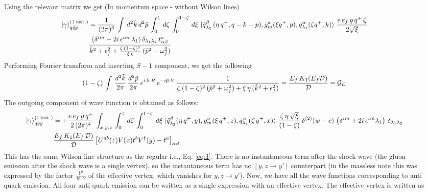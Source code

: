 \documentclass[9pt]{article}
\newif\ifmarked \markedtrue
\newcommand{\chg}[1]{\ifmarked{\color{red}#1}\else{#1}\fi}
\numberwithin{equation}{section}
\begin{document}
\begin{enumerate}
Using the relevant matrix  we get (In momentum space - without Wilson lines)
\begin{align}
\ket{\gamma}^{(1\,\text{inst.})}_{q\Bar{q}g} & = \frac{1}{(2\pi)^{6}}\, \int\, d^{2}\Tilde{k}\, d^{2}\Tilde{p}\, \int_{0}^{1}\, d\zeta\, \int_{0}^{1-\zeta}\, d\xi\,\ket{\Bar{q}^{\beta}_{\lambda_{2}}\,(\eta\,q^{+},q-k-p),g^{a}_{m}(\xi q^{+},p),q^{\alpha}_{\lambda_{1}}(\zeta q^{+},k)}\, \frac{e\,e_{f}\,g\,q^{+}\,\zeta}{2\sqrt{\xi}}\notag \\ & \frac{(\delta^{im} +2i\,\epsilon^{im}\,\lambda_{1})\,\delta_{\lambda_{1}\lambda_{2}}\,t^{a}_{\alpha\beta}}{\Tilde{k}^{2}+\epsilon^{2}_{f}+\frac{\zeta\,(1-\zeta)^{2}}{\xi\,\eta}\,(\Tilde{p}^{2} +\omega^{2}_{f})}
\end{align}
Performing Fourier transform and inserting $S-1$ component, we get the following
\begin{align}
    (1-\zeta)\, \int\, \frac{d^{2}\Tilde{k}}{2\pi}\, \frac{d^{2}\Tilde{p}}{2\pi}\, e^{i\,\Tilde{k}\cdot R}\, e^{-i\Tilde{p}\cdot Y}\, \frac{1}{\zeta\, (1-\zeta)^{2}\,(\Tilde{p}^{2}+\omega^{2}_{f}) + \xi\,\eta\,(\Tilde{k}^{2}+\epsilon^{2}_{f})} = \frac{E_{f}\,K_{1}(E_{f}\mathcal{D})}{\mathcal{D}} = \mathcal{G}_{E}
\end{align}
The outgoing component of wave function is obtained as follows:  
\begin{align}
\ket{\gamma}^{(1\,\text{inst.})}_{q\Bar{q}g} & = +\frac{e\,e_{f}\,g\,q^{+}}{2\,(2\pi)^{4}}\, \int_{x,y,z}\, \int_{0}^{1}\, d\zeta\, \int_{0}^{1-\zeta}\, d\xi\, \ket{\Bar{q}^{\beta}_{\lambda_{2}}(\eta\,q^{+},y),g^{a}_{m}(\xi\,q^{+},z),q^{\alpha}_{\lambda_{1}}(\zeta\,q^{+},x)}\, \frac{\zeta\,\eta\, \sqrt{\xi}}{(1-\zeta)}\, \delta^{(2)}(w-c)\, \left(\delta^{im}+2i\,\epsilon^{im}\lambda_{1}\right)\,\delta_{\lambda_{1}\lambda_{2}}\notag \\ & \frac{E_{f}\,K_{1}(E_{f}\,\mathcal{D})}{\mathcal{D}} \left[U^{ab}(z)V(x)t^{b}V^{\dagger}(y)-t^{a}\right]_{\alpha\beta}
\end{align}
This has the same Wilson line structure as the regular i.e., Eq. \eqref{eq:1}. \label{chg:Y2RY}\chg{There is no instantaneous term after the shock wave (the gluon emission after the shock wave is a single vertex), so the instantaneous term has no $[y,z\rightarrow y']$ counterpart (in the massless note this was expressed by the factor $\frac{Y^{2}}{R\cdot Y}$ of the effective vertex, which vanishes for $y,z\rightarrow y'$).} Now, we have all the wave functions corresponding to anti quark emission. All four anti quark emission can be written as a single expression with an effective vertex. The effective vertex is written as

\end{enumerate}
\end{document}
